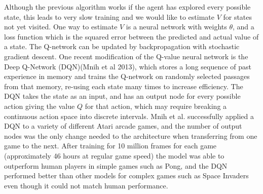 \documentclass[journal,onecolumn]{IEEEtran}
\begin{document}
Although the previous algorithm works if the agent has explored every possible state, this leads to very slow training and we would like to estimate $V$ for states not yet visited.  One way to estimate $V$ is a neural network with weights $\theta$, and a loss function which is the squared error between the predicted and actual value of a state.  The Q-network can be updated by backpropagation with stochastic gradient descent.  One recent modification of the Q-value neural network is the Deep Q-Network (DQN)(Mnih et al 2013), which stores a long sequence of past experience in memory and trains the Q-network on randomly selected passages from that memory, re-using each state many times to increase efficiency.  The DQN takes the state as an input, and has an output node for every possible action giving the value $Q$ for that action, which may require breaking a continuous action space into discrete intervals.  Mnih et al. successfully applied a DQN to a variety of different Atari arcade games, and the number of output nodes was the only change needed to the architecture when transferring from one game to the next.  After training for 10 million frames for each game (approximately 46 hours at regular game speed) the model was able to outperform human players in simple games such as Pong, and the DQN performed better than other models for complex games such as Space Invaders even though it could not match human performance.
\end{document}
